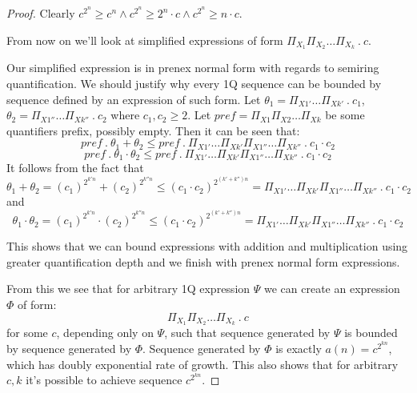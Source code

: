 \documentclass[12pt]{article}
\theoremstyle{definition}
\begin{document}
\begin{proof}
    Clearly $c^{2^n} \geq c^n \land c^{2^n} \geq 2^n \cdot c \land c^{2^n} \geq n \cdot c$.

    From now on we'll look at simplified expressions of form $\Pi_{X_1}\Pi_{X_2}\ldots \Pi_{X_k} \ . \ c$.

    Our simplified expression is in prenex normal form with regards to semiring quantification. We should justify why every 1Q sequence can be bounded by sequence defined by an expression of such form. Let $\theta_1 = \Pi_{X1'} \ldots \Pi_{Xk'} \ . \ c_1$, $\theta_2 = \Pi_{X1''} \ldots \Pi_{Xk''} \ . \ c_2$ where $c_1, c_2 \geq 2$. Let $pref = \Pi_{X1}\Pi_{X2} \ldots \Pi_{Xk}$ be some quantifiers prefix, possibly empty. Then it can be seen that:
    $$pref \ . \ \theta_1 + \theta_2 \leq pref \ . \ \Pi_{X1'} \ldots \Pi_{Xk'} \Pi_{X1''} \ldots \Pi_{Xk''} \ . \ c_1 \cdot c_2$$
    $$pref \ . \ \theta_1 \cdot \theta_2 \leq pref \ . \ \Pi_{X1'} \ldots \Pi_{Xk'} \Pi_{X1''} \ldots \Pi_{Xk''} \ . \ c_1 \cdot c_2$$
    It follows from the fact that
    $$\theta_1 + \theta_2 = (c_1)^{2^{k'n}} + (c_2)^{2^{k''n}} \leq (c_1 \cdot c_2)^{2^{(k' + k'')n}} = \Pi_{X1'} \ldots \Pi_{Xk'} \Pi_{X1''} \ldots \Pi_{Xk''} \ . \ c_1 \cdot c_2$$
    and
    $$\theta_1 \cdot \theta_2 = (c_1)^{2^{k'n}} \cdot (c_2)^{2^{k''n}} \leq (c_1 \cdot c_2)^{2^{(k' + k'')n}} = \Pi_{X1'} \ldots \Pi_{Xk'} \Pi_{X1''} \ldots \Pi_{Xk''} \ . \ c_1 \cdot c_2$$

    This shows that we can bound expressions with addition and multiplication using greater quantification depth and we finish with prenex normal form expressions.

    From this we see that for arbitrary 1Q expression $\varPsi$ we can create an expression $\varPhi$ of form:
    $$\Pi_{X_1}\Pi_{X_2}\ldots \Pi_{X_k} \ . \ c$$
    for some $c$, depending only on $\varPsi$, such that sequence generated by $\varPsi$ is bounded by sequence generated by $\varPhi$. Sequence generated by $\varPhi$ is exactly $a(n) = c^{2^{kn}}$, which has doubly exponential rate of growth. This also shows that for arbitrary $c, k$ it's possible to achieve sequence $c^{2^{kn}}$.
\end{proof}

\end{document}

